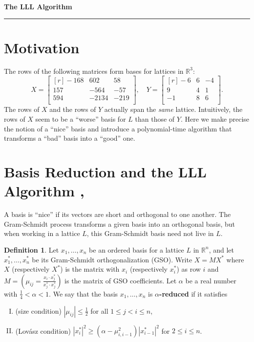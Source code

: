 \documentclass[11pt,letterpaper]{article}
\newcommand{\reals}{\mathbb{R}}
\theoremstyle{definition}
\newtheorem{definition}{Definition}
\begin{document}
\begin{center}
{\bf \Large The LLL Algorithm} %
\vspace{0.2cm}
\hrule
\end{center}
%	
\section*{Motivation}
The rows of the following matrices form bases for lattices in $\reals^3$:
\[
X = \begin{bmatrix*}[r]
	-168 & 602 & 58\\
	157 & -564 & -57\\
	594 & -2134 & -219\\
\end{bmatrix*}, \quad
Y = \begin{bmatrix*}[r]
	-6 & 6 & -4\\
	9 & 4 & 1\\
	-1 & 8 & 6\\
\end{bmatrix*}.
\]
The rows of $X$ and the rows of $Y$ actually span the \textit{same} lattice. Intuitively, the rows of $X$ seem to be a ``worse'' basis for $L$ than those of $Y$. Here we make precise the notion of a ``nice'' basis and introduce a polynomial-time algorithm that transforms a ``bad'' basis into a ``good'' one. 

\section*{Basis Reduction and the LLL Algorithm \cite{lll82}, \cite{hps14}}
A basis is ``nice'' if its vectors are short and orthogonal to one another. The Gram-Schmidt process transforms a given basis into an orthogonal basis, but when working in a lattice $L$, this Gram-Schmidt basis need not live in $L$.
\begin{definition}
	Let $x_1, \ldots, x_n$ be an ordered basis for a lattice $L$ in $\reals^n$, and let $x_1^*, \ldots, x_n^*$ be its Gram-Schmidt orthogonalization (GSO). Write $X = MX^*$ where $X$ (respectively $X^*$) is the matrix with $x_i$ (respectively $x_i^*$) as row $i$ and $M = (\mu_{ij} = \frac{x_i\cdot x_j^*}{x_j^*\cdot x_j^*})$ is the matrix of GSO coefficients. Let $\alpha$ be a real number with $\frac{1}{4}<\alpha<1$. We say that the basis $x_1, \ldots, x_n$ is \textbf{$\alpha$-reduced} if it satisfies
	\begin{enumerate}[(I)]
		\item (size condition) $|\mu_{ij}|\leq \frac{1}{2}$ for all $1\leq j<i\leq n$,
		\item (Lov\'asz condition) $|x_i^*|^2\geq (\alpha-\mu_{i,i-1}^2)|x_{i-1}^*|^2$ for $2\leq i\leq n$.
	\end{enumerate}
\end{definition}
\end{document}
